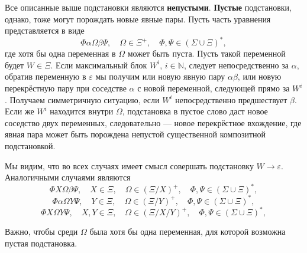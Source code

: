 \documentclass[12pt]{article}
\begin{document}
Все описанные выше подстановки являются \textbf{непустыми}. \textbf{Пустые}
подстановки, однако, тоже могут порождать новые явные пары. Пусть часть
уравнения представляется в виде
\begin{equation}
  \Phi \alpha \Omega \beta \Psi, \quad \Omega \in \Xi^+, \quad \Phi, \Psi \in
  (\Sigma \cup \Xi)^*,
\end{equation}
где хотя бы одна переменная в $\Omega$ может быть пуста. Пусть такой переменной
будет $W \in \Xi$. Если максимальный блок $W^i$, $i \in \mathbb{N}$, следует
непосредственно за $\alpha$, обратив переменную в $\varepsilon$ мы получим или
новую явную пару $\alpha \beta$, или новую перекрёстную пару при соседстве
$\alpha$ с новой переменной, следующей прямо за $W^i$. Получаем симметричную
ситуацию, если $W^i$ непосредственно предшествует $\beta$. Если же $W^i$
находится внутри $\Omega$, подстановка в пустое слово даст новое соседство двух
переменных, следовательно --- новое перекрёстное вхождение, где явная пара
может быть порождена непустой существенной композитной подстановкой.

Мы видим, что во всех случаях имеет смысл совершать подстановку $W \to
\varepsilon$. Аналогичными случаями являются
\begin{equation}
  \Phi X \Omega \beta \Psi, \quad X \in \Xi, \quad \Omega \in (\Xi / X)^+,
  \quad \Phi, \Psi \in (\Sigma \cup \Xi)^*,
\end{equation}
\begin{equation}
  \Phi \alpha \Omega Y \Psi, \quad Y \in \Xi, \quad \Omega \in (\Xi / Y)^+,
  \quad \Phi, \Psi \in (\Sigma \cup \Xi)^*,
\end{equation}
\begin{equation}
  \Phi X \Omega Y \Psi, \quad X, Y \in \Xi, \quad \Omega \in (\Xi / X / Y)^+,
  \quad \Phi, \Psi \in (\Sigma \cup \Xi)^*,
\end{equation}

Важно, чтобы среди $\Omega$ была хотя бы одна переменная, для которой возможна
пустая подстановка.
\end{document}
